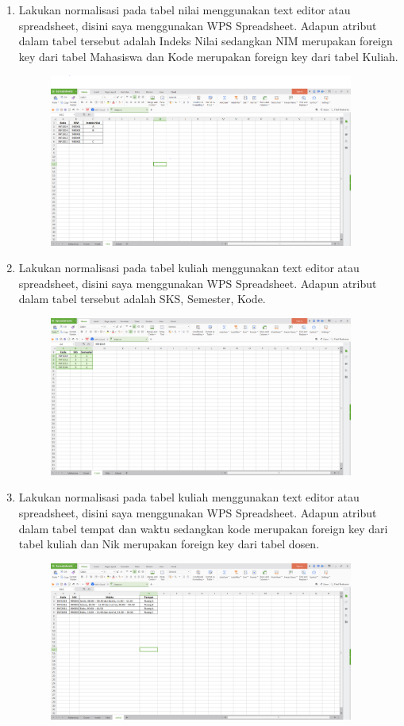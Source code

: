 \begin{enumerate}
\begin{figure}[ht]
    \end{figure}
    \item Lakukan normalisasi pada tabel nilai menggunakan text editor atau spreadsheet, disini saya menggunakan WPS Spreadsheet. Adapun atribut dalam tabel tersebut adalah Indeks Nilai sedangkan NIM merupakan foreign key dari tabel Mahasiswa dan Kode merupakan foreign key dari tabel Kuliah.
    \begin{figure}[ht]
    \centerline{\includegraphics[width=10cm]{Figures/Nilai.PNG}}
    \end{figure}
    \item Lakukan normalisasi pada tabel kuliah menggunakan text editor atau spreadsheet, disini saya menggunakan WPS Spreadsheet. Adapun atribut dalam tabel tersebut adalah SKS, Semester, Kode.
    \begin{figure}[ht]
    \centerline{\includegraphics[width=10cm]{Figures/Kuliah.PNG}}
    \end{figure}
     \item Lakukan normalisasi pada tabel kuliah menggunakan text editor atau spreadsheet, disini saya menggunakan WPS Spreadsheet. Adapun atribut dalam tabel tempat dan waktu sedangkan kode merupakan foreign key dari tabel kuliah dan Nik merupakan foreign key dari tabel dosen.
    \begin{figure}[ht]
    \centerline{\includegraphics[width=10cm]{Figures/Jadwal.PNG}}

\end{figure}
\end{enumerate}
